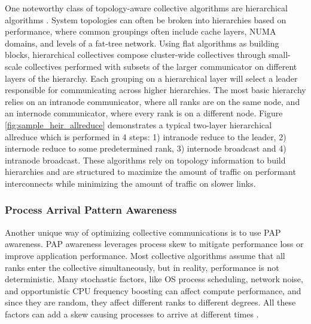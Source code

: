 One noteworthy class of topology-aware collective algorithms are hierarchical algorithms \cite{Chu2020NVGroup}.
System topologies can often be broken into hierarchies based on performance, where common groupings often include cache layers, \gls{NUMA} domains, and levels of a fat-tree network.
Using flat algorithms as building blocks, hierarchical collectives compose cluster-wide collectives through small-scale collectives performed with subsets of the larger communicator on different layers of the hierarchy.
Each grouping on a hierarchical layer will select a leader responsible for communicating across higher hierarchies.
The most basic hierarchy relies on an intranode communicator, where all ranks are on the same node, and an internode communicator, where every rank is on a different node.
Figure \ref{fig:sample_heir_allreduce} demonstrates a typical two-layer hierarchical allreduce which is performed in 4 steps: 1) intranode reduce to the leader, 2) internode reduce to some predetermined rank, 3) internode broadcast and 4) intranode broadcast.
These algorithms rely on topology information to build hierarchies and are structured to maximize the amount of traffic on performant interconnects while minimizing the amount of traffic on slower links.



\subsubsection{Process Arrival Pattern Awareness}
 Another unique way of optimizing collective communications is to use \gls{PAP} awareness.
 \gls{PAP} awareness leverages process skew to mitigate performance loss or improve application performance. 
Most collective algorithms assume that all ranks enter the collective simultaneously, but in reality, performance is not deterministic.
Many stochastic factors, like OS process scheduling, network noise, and opportunistic \gls{CPU} frequency boosting can affect compute performance, and since they are random, they affect different ranks to different degrees.
All these factors can add a skew causing processes to arrive at different times \cite{Faraj2008StudyProcArrivalMPIColl}.



